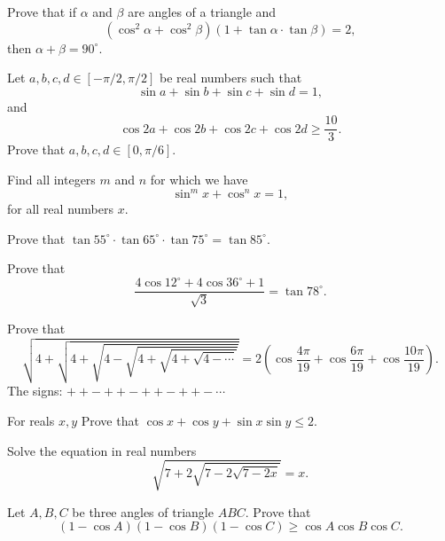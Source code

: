 \documentclass[12pt,a4paper]{memoir}
\theoremstyle{definition}
\begin{document}
\begin{question} Prove that if $ \alpha$ and $ \beta$ are angles of a triangle and $$ \left(\cos^2\alpha+ \cos^2\beta\right)\left(1+ \tan\alpha \cdot \tan\beta\right)= 2,$$ then $ \alpha + \beta= 90^{\circ}$.
\end{question}



\begin{question} Let $a,b,c,d \in [-\pi/2, \pi/2]$ be real numbers such that
	$$\sin{a}+\sin{b}+\sin{c}+\sin{d}=1,$$ and $$\cos{2a}+\cos{2b}+\cos{2c}+\cos{2d}\geq \frac{10}{3}.$$
	Prove that $a,b,c,d \in [0, \pi/6]$.
\end{question}


\begin{question} Find all integers $m$ and $n$ for which we have $$\sin^{m}x+\cos^{n}x=1,$$ for all real numbers $x$.
\end{question}


\begin{question} Prove that $\tan 55^{\circ} \cdot \tan 65^{\circ} \cdot \tan 75^{\circ}=\tan 85^{\circ}.$
\end{question}


\begin{question} Prove that $$\frac{4 \cos12^{\circ}+4 \cos 36^{\circ}+1}{\sqrt{3}}=\tan 78^{\circ}.$$
\end{question}


\begin{question} Prove that
	\[ \sqrt{4+\sqrt{4+\sqrt{4-\sqrt{4+\sqrt{4+\sqrt{4-\cdots}}}}}}=2\left(\cos\frac{4\pi}{19}+\cos\frac{6\pi}{19}+\cos\frac{10\pi}{19}\right).\]
	The signs: $ ++-++-++-++-\cdots$
\end{question}



\begin{question} For reals $x,y$ Prove that $\cos{x}+\cos{y}+\sin{x}\sin{y}\leq 2.$
\end{question}



\begin{question} Solve the equation in real numbers
	\[\sqrt{7+2\sqrt{7-2\sqrt{7-2x}}}=x.\]
\end{question}



\begin{question} Let $A,B,C$ be three angles of triangle $ABC$. Prove that
	\[(1-\cos A)(1-\cos B)(1-\cos C)\geq \cos A\cos B\cos C.\]
\end{question}
\end{document}
